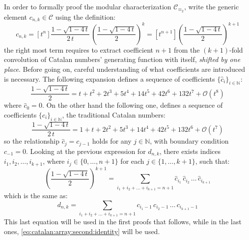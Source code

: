 In order to formally proof the modular characterization $\mathcal{C}_{\equiv_{2}}$, 
write the generic element $c_{n,k}\in\mathcal{C}$ using the definition:
\begin{displaymath}
    c_{n,k} = [t^n] \frac{1-\sqrt{1-4\,t}}{2\,t}\,
        \left(\frac{1-\sqrt{1-4\,t}}{2}\right)^{k}
           = [t^{n+1}] \left(\frac{1-\sqrt{1-4\,t}}{2}\right)^{k+1} 
\end{displaymath}
the right most term requires to extract coefficient $n+1$ from the $(k+1)$-fold
convolution of Catalan numbers' generating function with itself, \emph{shifted
by one place}. Before going on, careful
understanding of what coefficients are introduced is necessary. 
The following expansion defines a sequence of coefficients 
$\lbrace \hat{c}_{i}\rbrace_{i\in\mathbb{N}}$:
\begin{displaymath}
    \frac{1-\sqrt{1-4\,t}}{2} = t + t^{2} + 2 t^{3} + 5 t^{4} 
        + 14 t^{5} + 42 t^{6} + 132 t^{7} %
        + \mathcal{O}\left(t^{8}\right)
\end{displaymath}
where $\hat{c}_{0}=0$. On the other hand the following one, defines a sequence 
of coefficients $\lbrace c_{i}\rbrace_{i\in\mathbb{N}}$, 
the traditional Catalan numbers:
\begin{displaymath}
    \frac{1-\sqrt{1-4\,t}}{2\,t} = 1 + t + 2 t^{2} + 5 t^{3} + 14 t^{4} 
        + 42 t^{5} + 132 t^{6} %
        + \mathcal{O}\left(t^{7}\right)
\end{displaymath}
so the relationship $\hat{c}_{j} = c_{j-1}$ holds for any $j\in\mathbb{N}$, 
with boundary condition $c_{-1}=0$.  Looking at the previous expression for $d_{n,k}$,
there exists indices $i_{1}, i_{2}, \ldots, i_{k+1}$,
where $i_{j}\in\lbrace0,\ldots,n+1\rbrace$ for each $j\in\lbrace1,\ldots,k+1\rbrace$, 
such that:
\begin{displaymath}
    [t^{n+1}] \left(\frac{1-\sqrt{1-4\,t}}{2}\right)^{k+1} 
        = \sum_{i_{1}+ i_{2}+ \ldots+ i_{k+1}=n+1}{
            \hat{c}_{i_{1}}\,\hat{c}_{i_{2}}\,\ldots\,\hat{c}_{i_{k+1}} }
\end{displaymath}
which is the same as:
\begin{equation}
    d_{n,k} = \sum_{i_{1}+ i_{2}+ \ldots+ i_{k+1}=n+1}{
            c_{i_{1}-1}\,c_{i_{2}-1}\,\ldots\,c_{i_{k+1}-1} }
    \label{eq:convolution:expansion:for:generic:element:in:catalan:array}
\end{equation}
This last equation will be used in the first proofs that follows, while
in the last ones, \autoref{eq:catalan:array:second:identity} will be used.

